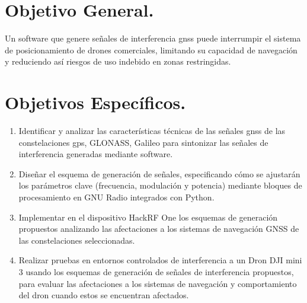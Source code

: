 
\section*{\fontsize{12}{18}\selectfont Objetivo General.}

\begin{justify}
    Un software que genere señales de interferencia \gls{gnss} puede interrumpir
    el sistema de posicionamiento de drones comerciales,
    limitando su capacidad de navegación y reduciendo así riesgos de uso
    indebido en zonas restringidas.
\end{justify}

\section*{\fontsize{12}{18}\selectfont Objetivos Específicos.}

\begin{justify}
    \begin{enumerate}
        \item Identificar y analizar las características técnicas de las señales
        \gls{gnss} de las constelaciones \gls{gps}, GLONASS, Galileo para sintonizar
        las señales de interferencia generadas mediante software.\\

        \item Diseñar el esquema de generación de señales, especificando 
        cómo se ajustarán los parámetros clave
        (frecuencia, modulación y potencia) mediante bloques de procesamiento
        en GNU Radio integrados con Python.\\

        \item Implementar en el dispositivo HackRF One los esquemas de
        generación propuestos analizando las afectaciones a los sistemas de
        navegación GNSS de las constelaciones seleccionadas.\\

        \item Realizar pruebas en entornos controlados de interferencia a un
        Dron DJI mini 3 usando los esquemas de generación de señales de
        interferencia propuestos, para evaluar las afectaciones a los sistemas
        de navegación y comportamiento del dron cuando estos se encuentran afectados.
    \end{enumerate}
\end{justify}